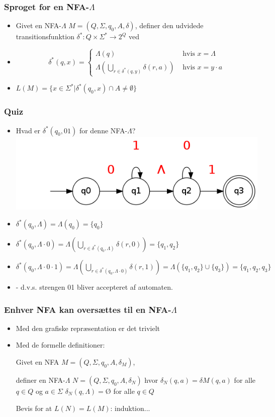 \begin{frame}
\frametitle{Sproget for en NFA-$\Lambda$}
\begin{itemize}[<+->]
\item Givet en NFA-$\Lambda$  $M=(Q, \Sigma , q_0, A, \delta )$, definer 
den udvidede transitionsfunktion $\delta^*: Q\times \Sigma^*\rightarrow  2^Q$ ved
\item \[\delta^*(q,x) =
  \begin{cases}
    \Lambda(q) & \text{ hvis } x=\Lambda \\
    \Lambda(\bigcup_{r\in \delta^*(q, y)}\delta(r, a)) & \text{ hvis } x=y\cdot a
  \end{cases}
\]
\item $L(M) = \{x \in \Sigma^* | \delta^*(q_0, x)\cap A \neq \emptyset \}$
\end{itemize}
\end{frame}
\begin{frame}
\frametitle{Quiz}
\begin{itemize}[<+->]
\item Hvad er $\delta^*(q_0, 01)$ for denne NFA-$\Lambda$?
\includegraphics[scale=0.4]{images/2_seminar_quiz_nfa_lambda}
\item $\delta^*(q_0, \Lambda) = \Lambda(q_0) = \{q_0\}$
\item $\delta^*(q_0, \Lambda \cdot 0) = \Lambda(\bigcup_{r\in \delta^*(q_0, \Lambda)} \delta(r, 0)) =
 \{q_1, q_2\}$
\item $\delta^*(q_0, \Lambda \cdot 0 \cdot 1) = 
\Lambda(\bigcup_{r\in \delta^*(q_0, \Lambda\cdot 0)} \delta(r, 1)) = \Lambda(\{q_1, q_2\}\cup\{q_3\}) = \{q_1, q_2, q_3\}$
\item - d.v.s. strengen 01 bliver accepteret af automaten.
\end{itemize}
\end{frame}

\begin{frame}
  \frametitle{Enhver NFA kan oversættes til en NFA-$\Lambda $}
\begin{itemize}[<+->]
\item Med den grafiske repræsentation er det trivielt

\item Med de formelle definitioner:

Givet en NFA $M=(Q, \Sigma , q_0, A, \delta_M)$, 

definer en NFA-$\Lambda $ $N=(Q, \Sigma , q_0, A, \delta_N)$ hvor 
$\delta_N(q, a) = \delta M(q, a)$  for alle $q\in Q$ og $a\in \Sigma$
$\delta_N(q, \Lambda) = Ø$ for alle $q\in Q$

Bevis for at $L(N) = L(M)$: induktion...
\end{itemize}
\end{frame}

